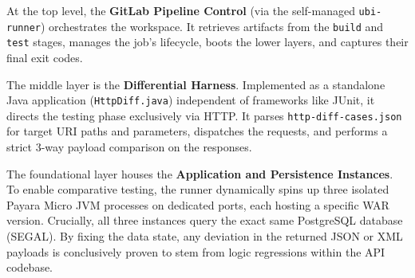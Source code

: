 At the top level, the \textbf{GitLab Pipeline Control} (via the self-managed
\texttt{ubi-runner}) orchestrates the workspace. It retrieves artifacts from
the \texttt{build} and \texttt{test} stages, manages the job's lifecycle, boots
the lower layers, and captures their final exit codes.

The middle layer is the \textbf{Differential Harness}. Implemented as a
standalone Java application (\texttt{HttpDiff.java}) independent of frameworks
like JUnit, it directs the testing phase exclusively via \ac{HTTP}. It
parses \texttt{http-diff-cases.json} for target \ac{URI} paths and
parameters, dispatches the requests, and performs a strict 3-way payload
comparison on the responses.

The foundational layer houses the \textbf{Application and Persistence
Instances}. To enable comparative testing, the runner dynamically spins up three
isolated Payara Micro \ac{JVM} processes on dedicated ports, each hosting a specific
\ac{WAR} version. Crucially, all three instances query the exact same
PostgreSQL database (\ac{SEGAL}). By fixing the data state, any deviation in
the returned \ac{JSON} or \ac{XML} payloads is conclusively proven to stem from
logic regressions within the \ac{API} codebase.